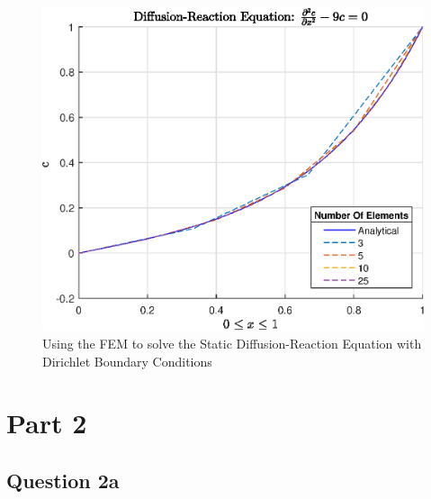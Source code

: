 \documentclass[11pt]{article}
\begin{document}
\begin{figure}[ht] 

    \centering
    \includegraphics{epsReactDiff1}
    \caption{Using the FEM to solve the Static Diffusion-Reaction Equation with Dirichlet Boundary Conditions}\label{fig:ChangeMesh}
\end{figure}

\clearpage


\section{Part 2}
\subsection{Question 2a}
\end{document}
